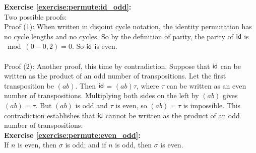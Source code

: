 \noindent\textbf{Exercise  \ref{exercise:permute:id_odd}:}\\
Two possible proofs:
\\
Proof (1): When written in disjoint cycle notation, the identity permutation has no cycle lengths and no cycles.  So by the definition of parity, the parity of  $\sf{id}$ is $\bmod(0-0,2) = 0$.  So $\sf{id}$ is even.\\
\\
Proof (2): Another proof, this time by contradiction.  Suppose that $\sf{id}$ can be written as the product of an odd number of transpositions.  Let the first transposition be $(ab)$.  Then $\sf{id}$ = $(ab)\tau$, where $\tau$ can be written as an even number of transpositions.  Multiplying both sides on the left by $(ab)$ gives $(ab) = \tau$.  But $(ab)$ is odd and $\tau$ is even, so $(ab)=\tau$ is impossible. This contradiction establishes that $\sf{id}$ cannot be written as the product of an odd number of transpositions.\\


\noindent\textbf{Exercise  \ref{exercise:permute:even_odd}:}\\
If $n$ is even, then $\sigma$ is odd; and if $n$ is odd, then $\sigma$ is even.\\

